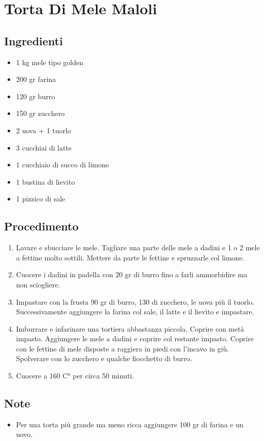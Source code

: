 \section{Torta Di Mele Maloli}
\subsection{Ingredienti}
\begin{itemize}
\item 1 kg mele tipo golden  
\item 200 gr farina  
\item 120 gr burro  
\item 150 gr zucchero  
\item 2 uova + 1 tuorlo  
\item 3 cucchiai di latte  
\item 1 cucchiaio di succo di limone  
\item 1 bustina di lievito  
\item 1 pizzico di sale
\end{itemize}
\subsection{Procedimento}
\begin{enumerate}
\item  Lavare e sbucciare le mele. Tagliare una parte delle mele a dadini e 1 o 2 mele a fettine molto sottili. Mettere da parte le fettine e spruzzarle col limone.  
\item  Cuocere i dadini in padella con 20 gr di burro fino a farli ammorbidire ma non sciogliere.  
\item  Impastare con la frusta 90 gr di burro, 130 di zucchero, le uova più il tuorlo. Successivamente aggiungere la farina col sale, il latte e il lievito e impastare.  
\item  Imburrare e infarinare una tortiera abbastanza piccola. Coprire con metà impasto. Aggiungere le mele a dadini e coprire col restante impasto. Coprire con le fettine di mele disposte a raggiera in piedi con l'incavo in giù. Spolverare con lo zucchero e qualche fiocchetto di burro.  
\item  Cuocere a 160 C° per circa 50 minuti.
\end{enumerate}
\subsection{Note}
\begin{itemize}
\item Per una torta più grande ma meno ricca aggiungere 100 gr di farina e un uovo.
\end{itemize}
